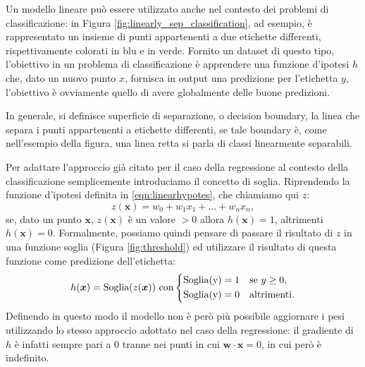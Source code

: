 \documentclass[../../main.tex]{subfiles}
\begin{document}
    Un modello lineare può essere utilizzato anche nel contesto dei problemi di classificazione: in Figura \ref{fig:linearly_sep_classification}, ad esempio,  è rappresentato un insieme di punti appartenenti a due etichette differenti, rispettivamente colorati in blu e in verde. Fornito un dataset di questo tipo, l'obiettivo in un problema di classificazione è apprendere una funzione d'ipotesi $h$ che, dato un nuovo punto $x$, fornisca in output una predizione per l'etichetta $y$, l'obiettivo è ovviamente quello di avere globalmente delle buone predizioni. 
    
    In generale, si definisce superficie di separazione, o decision boundary, la linea che separa i punti appartenenti a etichette differenti, se tale boundary è, come nell'esempio della figura, una linea retta si parla di classi linearmente separabili. 
    
    Per adattare l'approccio già citato per il caso della regressione al contesto della classificazione semplicemente introduciamo il concetto di soglia. Riprendendo la funzione d'ipotesi definita in \eqref{eqn:linearhypotes}, che chiamiamo qui $z$:
    \[z(\boldsymbol{x}) = w_0 + w_1x_1 + \dots + w_nx_n,\]
    se, dato un punto $\boldsymbol{x}$, $z(\boldsymbol{x})$ è un valore $> 0$ allora $h(\boldsymbol{x}) = 1$, altrimenti $h(\boldsymbol{x}) = 0$. Formalmente, possiamo quindi pensare di passare il risultato di $z$ in una funzione soglia (Figura \ref{fig:threshold}) ed utilizzare il risultato di questa funzione come predizione dell'etichetta:
    \[h(\boldsymbol{x}) = \text{Soglia}(z(\boldsymbol{x})) \ \text{con} 
    \begin{dcases}
        \text{Soglia(y)} = 1 & \text{se} \ y \geq 0, \\
        \text{Soglia(y)} = 0 & \text{altrimenti}. \\
    \end{dcases}\]
    Definendo in questo modo il modello non è però più possibile aggiornare i pesi utilizzando lo stesso approccio adottato nel caso della regressione: il gradiente di $h$ è infatti sempre pari a 0 tranne nei punti in cui $\boldsymbol{w} \cdot \boldsymbol{x} = 0$, in cui però è indefinito.
    
\end{document}
